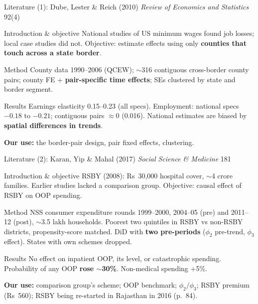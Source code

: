 \documentclass[compress]{beamer}
\newcommand{\Rs}{Rs~}
\newcommand{\hl}[1]{\textcolor{IITRRed}{\textbf{#1}}}
\begin{document}
\begin{frame}[t]{Literature (1): Dube, Lester \& Reich (2010)}
\scriptsize\emph{Review of Economics and Statistics} 92(4)\par\vspace{2pt}
\footnotesize
\begin{block}{Introduction \& objective}
National studies of US minimum wages found job losses; local case studies did not. Objective: estimate effects using only \textbf{counties that touch across a state border}.
\end{block}
\begin{block}{Method}
County data 1990--2006 (QCEW); $\sim$316 contiguous cross-border county pairs; county FE + \textbf{pair-specific time effects}; SEs clustered by state and border segment.
\end{block}
\begin{block}{Results}
Earnings elasticity 0.15--0.23 (all specs). Employment: national specs $-0.18$ to $-0.21$; contiguous pairs $\approx 0$ (0.016). National estimates are biased by \textbf{spatial differences in trends}.
\end{block}
\hl{Our use:} the border-pair design, pair fixed effects, clustering.
\end{frame}

\begin{frame}[t]{Literature (2): Karan, Yip \& Mahal (2017)}
\scriptsize\emph{Social Science \& Medicine} 181\par\vspace{2pt}
\footnotesize
\begin{block}{Introduction \& objective}
RSBY (2008): \Rs 30,000 hospital cover, $\sim$4 crore families. Earlier studies lacked a comparison group. Objective: causal effect of RSBY on OOP spending.
\end{block}
\begin{block}{Method}
NSS consumer expenditure rounds 1999--2000, 2004--05 (pre) and 2011--12 (post), $\sim$3.5 lakh households. Poorest two quintiles in RSBY vs non-RSBY districts, propensity-score matched. DiD with \textbf{two pre-periods} ($\phi_2$ pre-trend, $\phi_3$ effect). States with own schemes dropped.
\end{block}
\begin{block}{Results}
No effect on inpatient OOP, its level, or catastrophic spending. Probability of any OOP \textbf{rose $\sim$30\%}. Non-medical spending +5\%.
\end{block}
\hl{Our use:} comparison group's scheme; OOP benchmark; $\phi_2/\phi_3$; RSBY premium (\Rs 560); RSBY being re-started in Rajasthan in 2016 (p.\ 84).
\end{frame}
\end{document}
